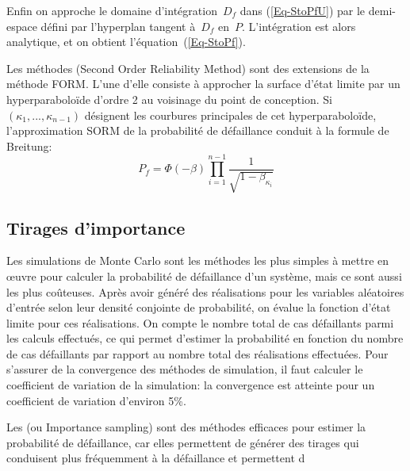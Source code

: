 Enfin on approche le domaine d'intégration~$D_f$ dans (\ref{Eq-StoPfU}) par le demi-espace défini par l'hyperplan tangent à~$D_f$ en~$P$. L'intégration est alors analytique, et on obtient l'équation~(\ref{Eq-StoPf}).

\medskip
Les méthodes  (Second Order Reliability Method) sont des extensions de la méthode FORM.
L'une d'elle consiste à approcher la surface d'état limite par un hyperparaboloïde d'ordre 2 au voisinage du point de conception. Si~$(\kappa_1, ..., \kappa_{n-1})$ désignent les courbures principales de cet hyperparaboloïde, l'approximation SORM de la probabilité de défaillance conduit à la formule de Breitung:
\begin{equation}
P_f = \Phi(-\beta)\prod_{i=1}^{n-1}\dfrac1{\sqrt{1-\beta_{\kappa_i}}}
\end{equation}

\medskip
\subsection{Tirages d'importance}

Les simulations de Monte Carlo sont les méthodes les plus simples à mettre en œuvre pour calculer la probabilité de défaillance d'un système, mais ce sont aussi les plus coûteuses. Après avoir généré des réalisations pour les variables aléatoires d'entrée selon leur densité conjointe de probabilité, on évalue la fonction d'état limite pour ces réalisations. On compte le nombre total de cas défaillants parmi les calculs effectués, ce qui permet d'estimer la probabilité en fonction du nombre de cas défaillants par rapport au nombre total des réalisations effectuées. Pour s'assurer de la convergence des méthodes de simulation, il faut calculer le coefficient de variation de la simulation: la convergence est atteinte pour un coefficient de variation d'environ 5\%.

Les  (ou Importance sampling) sont des méthodes efficaces pour estimer la probabilité de défaillance, car elles permettent de générer des tirages qui conduisent plus fréquemment à la défaillance et permettent d